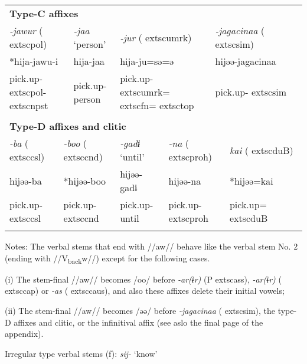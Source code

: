 \begin{tabularx}{\textwidth}{XXXXXXXm{}XXXXXXXXXXX}
\multicolumn{19}{X}{{\bfseries Type-C affixes}}\\
\multicolumn{3}{X}{{ \textit{{}-jawur} (	extsc{pol})}} & \multicolumn{2}{X}{{ \textit{{}-jaa} ‘person’}} & \multicolumn{5}{X}{{ \textit{{}-jur} (	extsc{umrk})}} & \multicolumn{9}{X}{{ \textit{{}-jagacinaa} (	extsc{sim})}}\\
\multicolumn{3}{X}{{ *hija-jawu-i}} & \multicolumn{2}{X}{hija-jaa} & \multicolumn{5}{X}{hija-ju=sə=ə} & \multicolumn{9}{X}{{ hijəə-jagacinaa}}\\
\multicolumn{3}{X}{pick.up-	extsc{pol}-	extsc{npst}} & \multicolumn{2}{X}{pick.up-person} & \multicolumn{5}{X}{pick.up-	extsc{umrk}=	extsc{fn}=	extsc{top}} & \multicolumn{9}{X}{pick.up-	extsc{sim}}\\
\multicolumn{19}{X}{}\\
\multicolumn{19}{X}{{\bfseries Type-D affixes and clitic}}\\
\multicolumn{2}{X}{{ \textit{{}-ba} (	extsc{csl})}} & \multicolumn{3}{X}{{ \textit{{}-boo} (	extsc{cnd})}} & \multicolumn{2}{X}{{ \textit{{}-gadɨ} ‘until’}} & \multicolumn{4}{X}{{ \textit{{}-na} (	extsc{proh})}} & \multicolumn{8}{X}{{ \textit{kai} (	extsc{du}B)}}\\
\multicolumn{2}{X}{{ hijəə-ba}} & \multicolumn{3}{X}{{ *hijəə-boo}} & \multicolumn{2}{X}{{ hijəə-gadɨ}} & \multicolumn{4}{X}{{ hijəə-na}} & \multicolumn{8}{X}{{ *hijəə=kai}}\\
\multicolumn{2}{X}{pick.up-	extsc{csl}} & \multicolumn{3}{X}{pick.up-	extsc{cnd}} & \multicolumn{2}{X}{pick.up-until} & \multicolumn{4}{X}{pick.up-	extsc{proh}} & \multicolumn{8}{X}{pick.up=	extsc{du}B}\\
\lspbottomrule
\end{tabularx}
Notes: The verbal stems that end with //aw// behave like the verbal stem No. 2 (ending with //V\textsubscript{back}w//) except for the following cases.

(i)  The stem-final //aw// becomes /oo/ before \textit{{}-ar(ɨr)} (P	extsc{ass}), \textit{{}-ar(ɨr)} (	extsc{cap}) or \textit{{}-as} (	extsc{caus}), and also these affixes delete their initial vowels;

(ii)  The stem-final //aw// becomes /əə/ before \textit{{}-jagacinaa} (	extsc{sim}), the type-D affixes and clitic, or the infinitival affix (see aslo the final page of the appendix).

Irregular type verbal stems (f): \textit{sij-} ‘know’

\tablefirsthead{}

